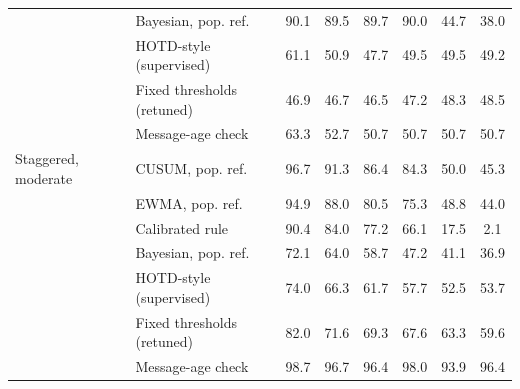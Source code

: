 \begin{table}[t]
{\begin{tabular}{llcccccc}
 & Bayesian, pop. ref. & 90.1 & 89.5 & 89.7 & 90.0 & 44.7 & 38.0 \\
 & HOTD-style (supervised) & 61.1 & 50.9 & 47.7 & 49.5 & 49.5 & 49.2 \\
 & Fixed thresholds (retuned) & 46.9 & 46.7 & 46.5 & 47.2 & 48.3 & 48.5 \\
 & Message-age check & 63.3 & 52.7 & 50.7 & 50.7 & 50.7 & 50.7 \\
\hline
Staggered, moderate & CUSUM, pop. ref. & 96.7 & 91.3 & 86.4 & 84.3 & 50.0 & 45.3 \\
 & EWMA, pop. ref. & 94.9 & 88.0 & 80.5 & 75.3 & 48.8 & 44.0 \\
 & Calibrated rule & 90.4 & 84.0 & 77.2 & 66.1 & 17.5 & 2.1 \\
 & Bayesian, pop. ref. & 72.1 & 64.0 & 58.7 & 47.2 & 41.1 & 36.9 \\
 & HOTD-style (supervised) & 74.0 & 66.3 & 61.7 & 57.7 & 52.5 & 53.7 \\
 & Fixed thresholds (retuned) & 82.0 & 71.6 & 69.3 & 67.6 & 63.3 & 59.6 \\
 & Message-age check & 98.7 & 96.7 & 96.4 & 98.0 & 93.9 & 96.4 \\
\hline
\end{tabular}}
\end{table}

